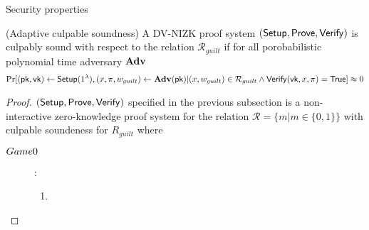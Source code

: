   \begin{subsection}{Security properties}

    \begin{definition}{(Adaptive culpable soundness) }
      A DV-NIZK proof system $({\mathsf{Setup}}, {\mathsf{Prove}}, {\mathsf{Verify}})$ is culpably sound with respect to the relation $\mathcal{R}_{guilt}$ if for all porobabilistic polynomial time adversary $\mathbf{Adv}$
      \begin{align*}
        \Pr[(\mathsf{pk}, \mathsf{vk}) \gets {\mathsf{Setup}}(1^{\lambda}), (x, \pi, w_{guilt}) \gets \mathbf{Adv}(\mathsf{pk}) | (x, w_{guilt}) \in \mathcal{R}_{guilt} \wedge {\mathsf{Verify}}(\mathsf{vk}, x, \pi) = \mathsf{True}] \approx 0
      \end{align*}
    \end{definition}
    
    \begin{proof}
      $({\mathsf{Setup}}, {\mathsf{Prove}}, {\mathsf{Verify}})$ specified in the previous subsection is a non-interactive zero-knowledge proof system for the relation $\mathcal{R} = \{ m | m \in \{0,1\}\}$ with culpable soundeness for $R_{guilt}$ where
      \begin{lemma}
    	\begin{description}
    	\item[$\boldmath{Game 0}$] :
    	  \begin{enumerate}
    	  \item 
    	  \end{enumerate}
    	\end{description}
      \end{lemma}
    \end{proof}
  \end{subsection}
